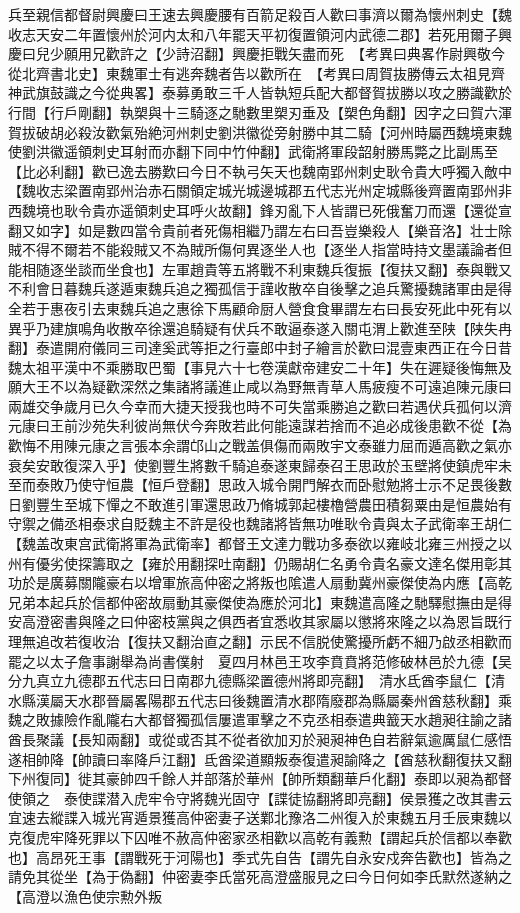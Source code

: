 兵至親信都督尉興慶曰王速去興慶腰有百箭足殺百人歡曰事濟以爾為懷州刺史【魏收志天安二年置懷州於河内太和八年罷天平初復置領河内武德二郡】若死用爾子興慶曰兒少願用兄歡許之【少詩沼翻】興慶拒戰矢盡而死　【考異曰典畧作尉興敬今從北齊書北史】東魏軍士有逃奔魏者告以歡所在　【考異曰周賀抜勝傳云太祖見齊神武旗鼓識之今從典畧】泰募勇敢三千人皆執短兵配大都督賀拔勝以攻之勝識歡於行間【行戶剛翻】執槊與十三騎逐之馳數里槊刃垂及【槊色角翻】因字之曰賀六渾賀拔破胡必殺汝歡氣殆絶河州刺史劉洪徽從旁射勝中其二騎【河州時屬西魏境東魏使劉洪徽遥領刺史耳射而亦翻下同中竹仲翻】武衛將軍段韶射勝馬斃之比副馬至【比必利翻】歡已逸去勝歎曰今日不執弓矢天也魏南郢州刺史耿令貴大呼獨入敵中【魏收志梁置南郢州治赤石關領定城光城邊城郡五代志光州定城縣後齊置南郢州非西魏境也耿令貴亦遥領刺史耳呼火故翻】鋒刃亂下人皆謂已死俄奮刀而還【還從宣翻又如字】如是數四當令貴前者死傷相繼乃謂左右曰吾豈樂殺人【樂音洛】壮士除賊不得不爾若不能殺賊又不為賊所傷何異逐坐人也【逐坐人指當時持文墨議論者但能相随逐坐談而坐食也】左軍趙貴等五將戰不利東魏兵復振【復扶又翻】泰與戰又不利會日暮魏兵遂遁東魏兵追之獨孤信于謹收散卒自後擊之追兵驚擾魏諸軍由是得全若于惠夜引去東魏兵追之惠徐下馬顧命厨人營食食畢謂左右曰長安死此中死有以異乎乃建旗鳴角收散卒徐還追騎疑有伏兵不敢逼泰遂入關屯渭上歡進至陕【陕失冉翻】泰遣開府儀同三司達奚武等拒之行臺郎中封子繪言於歡曰混壹東西正在今日昔魏太祖平漢中不乘勝取巴蜀【事見六十七卷漢獻帝建安二十年】失在遲疑後悔無及願大王不以為疑歡深然之集諸將議進止咸以為野無青草人馬疲瘦不可遠追陳元康曰兩雄交争歲月已久今幸而大捷天授我也時不可失當乘勝追之歡曰若遇伏兵孤何以濟元康曰王前沙苑失利彼尚無伏今奔敗若此何能遠謀若捨而不追必成後患歡不從【為歡悔不用陳元康之言張本余謂邙山之戰盖俱傷而兩敗宇文泰雖力屈而遁高歡之氣亦衰矣安敢復深入乎】使劉豐生將數千騎追泰遂東歸泰召王思政於玉壁將使鎮虎牢未至而泰敗乃使守恒農【恒戶登翻】思政入城令開門解衣而卧慰勉將士示不足畏後數日劉豐生至城下憚之不敢進引軍還思政乃脩城郭起樓櫓營農田積芻粟由是恒農始有守禦之備丞相泰求自貶魏主不許是役也魏諸將皆無功唯耿令貴與太子武衛率王胡仁【魏盖改東宫武衛將軍為武衛率】都督王文達力戰功多泰欲以雍岐北雍三州授之以州有優劣使探籌取之【雍於用翻探吐南翻】仍賜胡仁名勇令貴名豪文達名傑用彰其功於是廣募關隴豪右以增軍旅高仲密之將叛也隂遣人扇動冀州豪傑使為内應【高乾兄弟本起兵於信都仲密故扇動其豪傑使為應於河北】東魏遣高隆之馳驛慰撫由是得安高澄密書與隆之曰仲密枝黨與之俱西者宜悉收其家屬以懲將來隆之以為恩旨既行理無追改若復收治【復扶又翻治直之翻】示民不信脱使驚擾所虧不細乃啟丞相歡而罷之以太子詹事謝舉為尚書僕射　夏四月林邑王攻李賁賁將范修破林邑於九德【吴分九真立九德郡五代志曰日南郡九德縣梁置德州將即亮翻】　清水氐酋李鼠仁【清水縣漢屬天水郡晉屬畧陽郡五代志曰後魏置清水郡隋廢郡為縣屬秦州酋慈秋翻】乘魏之敗據險作亂隴右大都督獨孤信屢遣軍擊之不克丞相泰遣典籖天水趙昶往諭之諸酋長聚議【長知兩翻】或從或否其不從者欲加刃於昶昶神色自若辭氣逾厲鼠仁感悟遂相帥降【帥讀曰率降戶江翻】氐酋梁道顯叛泰復遣昶諭降之【酋慈秋翻復扶又翻下州復同】徙其豪帥四千餘人并部落於華州【帥所類翻華戶化翻】泰即以昶為都督使領之　泰使諜潜入虎牢令守將魏光固守【諜徒協翻將即亮翻】侯景獲之改其書云宜速去縱諜入城光宵遁景獲高仲密妻子送鄴北豫洛二州復入於東魏五月壬辰東魏以克復虎牢降死罪以下囚唯不赦高仲密家丞相歡以高乾有義勲【謂起兵於信都以奉歡也】高昂死王事【謂戰死于河陽也】季式先自告【謂先自永安戍奔告歡也】皆為之請免其從坐【為于偽翻】仲密妻李氏當死高澄盛服見之曰今日何如李氏默然遂納之【高澄以漁色使宗勲外叛